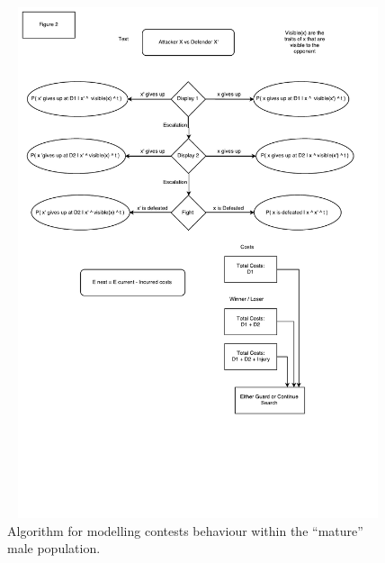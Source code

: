 \documentclass[a4paper,11pt]{article}
\begin{document}
\begin{figure}[h!]
\centering
\includegraphics[width=15cm,height=15cm,keepaspectratio]{figures/contest_algorithm}
\caption{Algorithm for modelling contests behaviour within the ``mature'' male population.}
\label{fig:contests}
\end{figure}
\clearpage


\end{document}
